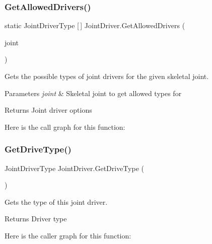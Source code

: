 \subsubsection{\texorpdfstring{Get\+Allowed\+Drivers()}{GetAllowedDrivers()}}
{\footnotesize\ttfamily static Joint\+Driver\+Type \mbox{[}$\,$\mbox{]} Joint\+Driver.\+Get\+Allowed\+Drivers (\begin{DoxyParamCaption}\item[{\hyperlink{class_skeletal_joint___base}{Skeletal\+Joint\+\_\+\+Base}}]{joint }\end{DoxyParamCaption})\hspace{0.3cm}{\ttfamily [static]}}



Gets the possible types of joint drivers for the given skeletal joint. 


\begin{DoxyParams}{Parameters}
{\em joint} & Skeletal joint to get allowed types for\\
\hline
\end{DoxyParams}
\begin{DoxyReturn}{Returns}
Joint driver options
\end{DoxyReturn}
Here is the call graph for this function\+:
\mbox{\label{class_joint_driver_ab63c7e975d5b4317b7c47ffb34596b78}} 
\subsubsection{\texorpdfstring{Get\+Drive\+Type()}{GetDriveType()}}
{\footnotesize\ttfamily Joint\+Driver\+Type Joint\+Driver.\+Get\+Drive\+Type (\begin{DoxyParamCaption}{ }\end{DoxyParamCaption})}



Gets the type of this joint driver. 

\begin{DoxyReturn}{Returns}
Driver type
\end{DoxyReturn}
Here is the caller graph for this function\+:
\mbox{\label{class_joint_driver_ab791d90626a1821f03329d65ccbe3e74}} 
